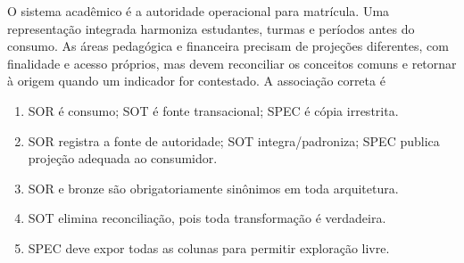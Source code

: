 \TextoBase O sistema acadêmico é a autoridade operacional para matrícula. Uma representação integrada harmoniza estudantes, turmas e períodos antes do consumo. As áreas pedagógica e financeira precisam de projeções diferentes, com finalidade e acesso próprios, mas devem reconciliar os conceitos comuns e retornar à origem quando um indicador for contestado.
\FonteDidatica
\Comando A associação correta é
\begin{enumerate}[label=\Alph*)]\item SOR é consumo; SOT é fonte transacional; SPEC é cópia irrestrita.\item SOR registra a fonte de autoridade; SOT integra/padroniza; SPEC publica projeção adequada ao consumidor.\item SOR e bronze são obrigatoriamente sinônimos em toda arquitetura.\item SOT elimina reconciliação, pois toda transformação é verdadeira.\item SPEC deve expor todas as colunas para permitir exploração livre.\end{enumerate}

